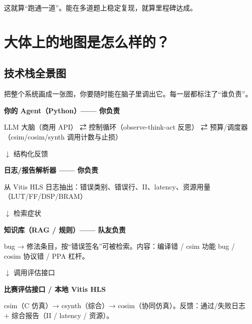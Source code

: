 \documentclass[12pt,a4paper]{ctexbook}
\begin{document}
这就算“跑通一道”。能在多道题上稳定复现，就算里程碑达成。

\chapter{大体上的地图是怎么样的？}

\section{技术栈全景图}

把整个系统画成一张图，你要随时能在脑子里调出它。每一层都标注了“谁负责”。

\begin{tipbox}
\textbf{你的 Agent（Python）—— 你负责}\par
LLM 大脑（商用 API） ⇄ 控制循环（observe-think-act 反思） ⇄ 预算/调度器（csim/cosim/synth 调用计数与止损）
\end{tipbox}

\vspace{4pt}
\begin{center}\large $\downarrow$ 结构化反馈\end{center}
\vspace{4pt}

\begin{tipbox}
\textbf{日志/报告解析器 —— 你负责}\par
从 Vitis HLS 日志抽出：错误类别、错误行、II、latency、资源用量（LUT/FF/DSP/BRAM）
\end{tipbox}

\vspace{4pt}
\begin{center}\large $\downarrow$ 检索症状\end{center}
\vspace{4pt}

\begin{warnbox}
\textbf{知识库（RAG / 规则）—— 队友负责}\par
bug → 修法条目，按“错误签名”可被检索。内容：编译错 / csim 功能 bug / cosim 协议错 / PPA 杠杆。
\end{warnbox}

\vspace{4pt}
\begin{center}\large $\downarrow$ 调用评估接口\end{center}
\vspace{4pt}

\begin{notebox}
\textbf{比赛评估接口 / 本地 Vitis HLS}\par
csim（C 仿真）→ csynth（综合）→ cosim（协同仿真）。反馈：通过/失败日志 + 综合报告（II / latency / 资源）。
\end{notebox}
\end{document}
